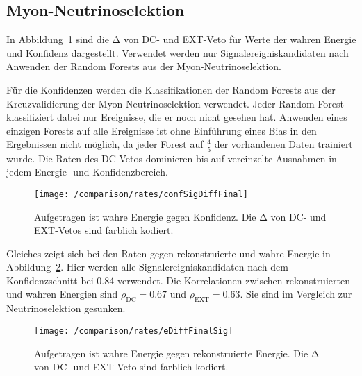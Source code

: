 \subsection{Myon-Neutrinoselektion}

In Abbildung~\ref{fig:confDiffFinalSig} sind die $\mathrm{Δ}$ von DC- und EXT-Veto für Werte der wahren Energie und Konfidenz dargestellt.
Verwendet werden nur Signalereigniskandidaten nach Anwenden der Random Forests aus der Myon-Neutrinoselektion.

Für die Konfidenzen werden die Klassifikationen der Random Forests aus der Kreuzvalidierung der Myon-Neutrinoselektion verwendet.
Jeder Random Forest klassifiziert dabei nur Ereignisse, die er noch nicht gesehen hat.
Anwenden eines einzigen Forests auf alle Ereignisse ist ohne Einführung eines Bias in den Ergebnissen nicht möglich, da jeder Forest auf $\tfrac45$ der vorhandenen Daten trainiert wurde.  
Die Raten des DC-Vetos dominieren bis auf vereinzelte Ausnahmen in jedem Energie- und Konfidenzbereich.
\begin{figure}
\begin{center}
    \texttt{[image: /comparison/rates/confSigDiffFinal]}
\end{center}
\vspace{-2em}
    \caption{Aufgetragen ist wahre Energie gegen Konfidenz. Die $\mathrm{Δ}$ von DC- und EXT-Vetos sind farblich kodiert.}
\label{fig:confDiffFinalSig}
\end{figure}
Gleiches zeigt sich bei den Raten gegen rekonstruierte und wahre Energie in Abbildung~\ref{fig:eDiffFinalSig}.
Hier werden alle Signalereigniskandidaten nach dem Konfidenzschnitt bei 0.84 verwendet.
Die Korrelationen zwischen rekonstruierten und wahren Energien sind $ρ _\text{DC}= 0.67$ und $ρ_\text{EXT} = 0.63$.  
Sie sind im Vergleich zur Neutrinoselektion gesunken.
\begin{figure}
\begin{center}
    \texttt{[image: /comparison/rates/eDiffFinalSig]}
\end{center}
\vspace{-2em}
    \caption{Aufgetragen ist wahre Energie gegen rekonstruierte Energie. Die $\mathrm{Δ}$ von DC- und EXT-Veto sind farblich kodiert.}
\label{fig:eDiffFinalSig}
\end{figure}


